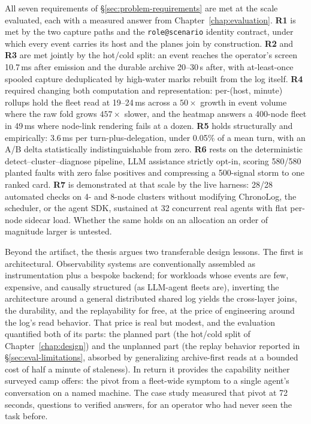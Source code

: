 All seven requirements of \S\ref{sec:problem-requirements} are met at the
scale evaluated, each
with a measured answer from Chapter~\ref{chap:evaluation}. \textbf{R1} is
met by the two capture paths and the \texttt{role@scenario} identity
contract, under which every event carries its host and the planes join by
construction. \textbf{R2} and \textbf{R3} are met jointly by the hot/cold
split: an event reaches the operator's screen 10.7\,ms after emission and
the durable archive 20--30\,s after, with at-least-once spooled capture
deduplicated by high-water marks rebuilt from the log itself. \textbf{R4}
required changing both computation and representation: per-(host, minute)
rollups hold the fleet read at 19--24\,ms across a $50\times$ growth in
event volume where the raw fold grows $457\times$ slower, and the heatmap
answers a 400-node fleet in 49\,ms where node-link rendering fails at a
dozen.
\textbf{R5} holds structurally and empirically: 3.6\,ms per
turn-plus-delegation, under 0.05\% of a mean turn, with an A/B delta
statistically indistinguishable from zero. \textbf{R6} rests on the
deterministic detect--cluster--diagnose pipeline, LLM assistance strictly
opt-in, scoring 580/580 planted faults with zero false positives and
compressing a 500-signal storm to one ranked card. \textbf{R7} is
demonstrated at that scale by the live harness: 28/28 automated checks on
4- and 8-node
clusters without modifying ChronoLog, the scheduler, or the agent SDK,
sustained at 32 concurrent real agents with flat per-node sidecar load.
Whether the same holds on an allocation an order of magnitude larger is
untested.

Beyond the artifact, the thesis argues two transferable design lessons.
The first is architectural. Observability systems are conventionally
assembled as instrumentation plus a bespoke backend; for workloads
whose events are few, expensive, and causally structured (as
LLM-agent fleets are), inverting the architecture around a general
distributed shared log yields the cross-layer joins, the durability,
and the replayability for free, at the price of engineering around the
log's read behavior. That price is real but modest, and the evaluation
quantified both of its parts: the planned part (the hot/cold split of
Chapter~\ref{chap:design}) and the unplanned part
(the replay behavior reported in \S\ref{sec:eval-limitations}, absorbed by
generalizing archive-first reads at a bounded cost of half a minute of
staleness). In return it provides the capability neither surveyed camp
offers: the pivot from a fleet-wide symptom to a single agent's
conversation on a named machine. The case study measured that pivot at
72 seconds, questions to verified answers, for an operator who had
never seen the task before.

